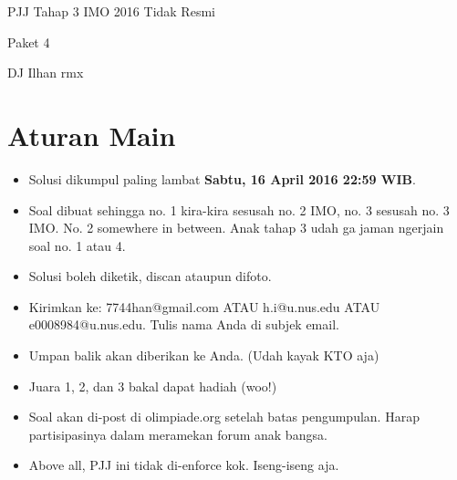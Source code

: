 \documentclass{article}
\begin{document}
	\begin{center}
		{\huge PJJ Tahap 3 IMO 2016 Tidak Resmi}
		
		\vspace{1em}
		
		{\Large Paket 4}
		
		\vspace{1em}
		
		DJ Ilhan rmx
	\end{center}
	\section{Aturan Main}
	\begin{itemize}
		\item Solusi dikumpul paling lambat \textbf{Sabtu, 16 April 2016 22:59 WIB}.
		\item Soal dibuat sehingga no. 1 kira-kira sesusah no. 2 IMO, no. 3 sesusah no. 3 IMO. No. 2 somewhere in between. Anak tahap 3 udah ga jaman ngerjain soal no. 1 atau 4.
		\item Solusi boleh diketik, discan ataupun difoto.
		\item Kirimkan ke: 7744han@gmail.com ATAU h.i@u.nus.edu ATAU e0008984@u.nus.edu. Tulis nama Anda di subjek email.
		\item Umpan balik akan diberikan ke Anda. (Udah kayak KTO aja)
		\item Juara 1, 2, dan 3 bakal dapat hadiah (woo!)
		\item Soal akan di-post di olimpiade.org setelah batas pengumpulan. Harap partisipasinya dalam meramekan forum anak bangsa.
		\item Above all, PJJ ini tidak di-enforce kok. Iseng-iseng aja.
	\end{itemize}
\end{document}
